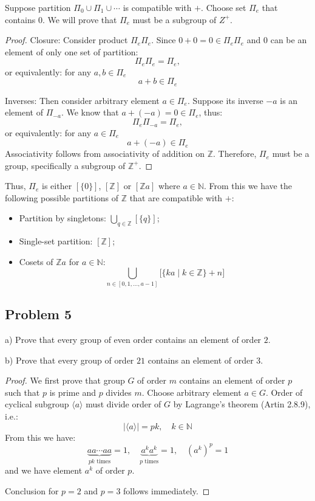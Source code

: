 \documentclass{article}
\theoremstyle{definition}
\newcommand{\Z}{\mathbb{Z}}
\newcommand{\N}{\mathbb{N}}
\begin{document}
Suppose partition $\Pi_0 \cup \Pi_1 \cup \cdots$ is compatible with $+$.
Choose set $\Pi_e$ that contains $0$.
We will prove that $\Pi_e$ must be a subgroup of $Z^+$.

\begin{proof}

Closure: Consider product $\Pi_e \Pi_e$.
Since $0+0 = 0 \in \Pi_e \Pi_e$ and $0$ can be an element of only one set of partition:
\[ \Pi_e \Pi_e = \Pi_e, \]
or equivalently: for any $a,b \in \Pi_e$
\[ a + b \in \Pi_e \]

Inverses: Then consider arbitrary element $a \in \Pi_e$.
Suppose its inverse $-a$ is an element of $\Pi_{-a}$. We know that $a+(-a) = 0 \in \Pi_e$, thus:
\[ \Pi_e \Pi_{-a} = \Pi_e, \]
or equivalently: for any $a \in \Pi_e$
\[ a + (-a) \in \Pi_e \]
Associativity follows from associativity of addition on $\Z$.
Therefore, $\Pi_e$ must be a group, specifically a subgroup of $\Z^+$.

\end{proof}

Thus, $\Pi_e$ is either $[\{0\}]$, $[\Z]$ or $[\Z a]$ where $a \in \N$.
From this we have the following possible partitions of $\Z$ that are compatible with $+$:
\begin{itemize}
    \item Partition by singletons: $\bigcup_{q \in \Z} [\{q\}]$;
    \item Single-set partition: $[\Z]$;
    \item Cosets of $\Z a$ for $a \in \N$:
    \[ \bigcup_{n\in [0, 1, \dots, a-1]} \biggl[ \{ ka \mid k \in \Z \} + n \biggr] \]
\end{itemize}


\subsection*{Problem 5}

\begin{tcolorbox}
a) Prove that every group of even order contains an element of order $2$.

b) Prove that every group of order $21$ contains an element of order $3$.
\end{tcolorbox}

\begin{proof}

We first prove that group $G$ of order $m$ contains an element of order $p$ such that $p$ is prime and $p$ divides $m$.
Choose arbitrary element $a \in G$.
Order of cyclical subgroup $\langle a \rangle$ must divide order of $G$ by Lagrange's theorem (Artin 2.8.9), i.e.:
\[ \bigl| \langle a \rangle \bigr| = pk, \quad k \in \N \]
From this we have:
\[ \underbrace{ a a \cdots a a }_{pk \text{ times}} = 1, \quad \underbrace{ a^k a^k }_{p \text{ times}} = 1, \quad (a^k)^p = 1 \]
and we have element $a^k$ of order $p$.

Conclusion for $p = 2$ and $p = 3$ follows immediately.

\end{proof}
\end{document}
